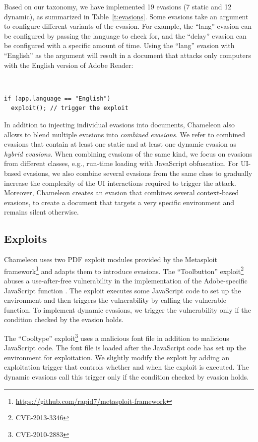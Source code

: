 Based on our taxonomy, we have implemented 19 evasions (7 static and 12 dynamic), as summarized in Table~\ref{t:evasions}.
Some evasions take an argument to configure different variants of the evasion.
For example, the ``lang'' evasion can be configured by passing the language to check for, and the ``delay'' evasion can be configured with a specific amount of time.
Using the ``lang'' evasion with ``English'' as the argument will result in a document that attacks only computers with the English version of Adobe Reader:
{\tt \small
\begin{verbatim}
if (app.language == "English")
  exploit(); // trigger the exploit
\end{verbatim}
}

In addition to injecting individual evasions into documents, Chameleon 
also allows to  blend multiple evasions into \emph{combined evasions}.
We refer to combined evasions that contain at least one static and at least 
one dynamic evasion as \emph{hybrid evasions}.
When combining evasions of the same kind, we focus on evasions from different classes, e.g., run-time loading with JavaScript obfuscation.
For UI-based evasions, we also combine several evasions from the same class to gradually increase the complexity of the UI interactions required to trigger the attack.
Moreover, Chameleon creates an evasion that combines several context-based evasions, to create a document that targets a very specific environment and remains silent otherwise.

\subsection{Exploits}
\label{ss: exploits}

Chameleon uses two PDF exploit modules provided by the Metasploit framework\footnote{\url{https://github.com/rapid7/metasploit-framework}} and adapts them to introduce evasions.
The ``Toolbutton'' exploit\footnote{CVE-2013-3346} abuses a use-after-free vulnerability in the implementation of the Adobe-specific JavaScript function .
The exploit executes some JavaScript code to set up the environment and then triggers the vulnerability by calling the vulnerable function.
To implement dynamic evasions, we trigger the vulnerability only if the condition checked by the evasion holds.

The ``Cooltype'' exploit\footnote{CVE-2010-2883} uses a malicious font file in addition to malicious JavaScript code.
The font file is loaded after the JavaScript code has set up the environment for exploitation.
We slightly modify the exploit by adding an exploitation trigger that controls whether and when the exploit is executed.
The dynamic evasions call this trigger only if the condition checked by evasion holds.

